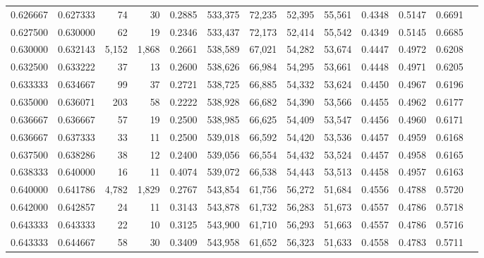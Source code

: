 \begin{tabular}{rrrrrrrrrrrrr}
0.626667 & 0.627333 &     74 &    30 &                                     0.2885 & 533,375 &  72,235 &  52,395 &  55,561 & 0.4348 & 0.5147 & 0.6691 \\
0.627500 & 0.630000 &     62 &    19 &                                     0.2346 & 533,437 &  72,173 &  52,414 &  55,542 & 0.4349 & 0.5145 & 0.6685 \\
0.630000 & 0.632143 &  5,152 & 1,868 &                                     0.2661 & 538,589 &  67,021 &  54,282 &  53,674 & 0.4447 & 0.4972 & 0.6208 \\
0.632500 & 0.633222 &     37 &    13 &                                     0.2600 & 538,626 &  66,984 &  54,295 &  53,661 & 0.4448 & 0.4971 & 0.6205 \\
0.633333 & 0.634667 &     99 &    37 &                                     0.2721 & 538,725 &  66,885 &  54,332 &  53,624 & 0.4450 & 0.4967 & 0.6196 \\
0.635000 & 0.636071 &    203 &    58 &                                     0.2222 & 538,928 &  66,682 &  54,390 &  53,566 & 0.4455 & 0.4962 & 0.6177 \\
0.636667 & 0.636667 &     57 &    19 &                                     0.2500 & 538,985 &  66,625 &  54,409 &  53,547 & 0.4456 & 0.4960 & 0.6171 \\
0.636667 & 0.637333 &     33 &    11 &                                     0.2500 & 539,018 &  66,592 &  54,420 &  53,536 & 0.4457 & 0.4959 & 0.6168 \\
0.637500 & 0.638286 &     38 &    12 &                                     0.2400 & 539,056 &  66,554 &  54,432 &  53,524 & 0.4457 & 0.4958 & 0.6165 \\
0.638333 & 0.640000 &     16 &    11 &                                     0.4074 & 539,072 &  66,538 &  54,443 &  53,513 & 0.4458 & 0.4957 & 0.6163 \\
0.640000 & 0.641786 &  4,782 & 1,829 &                                     0.2767 & 543,854 &  61,756 &  56,272 &  51,684 & 0.4556 & 0.4788 & 0.5720 \\
0.642000 & 0.642857 &     24 &    11 &                                     0.3143 & 543,878 &  61,732 &  56,283 &  51,673 & 0.4557 & 0.4786 & 0.5718 \\
0.643333 & 0.643333 &     22 &    10 &                                     0.3125 & 543,900 &  61,710 &  56,293 &  51,663 & 0.4557 & 0.4786 & 0.5716 \\
0.643333 & 0.644667 &     58 &    30 &                                     0.3409 & 543,958 &  61,652 &  56,323 &  51,633 & 0.4558 & 0.4783 & 0.5711 \\

\end{tabular}
